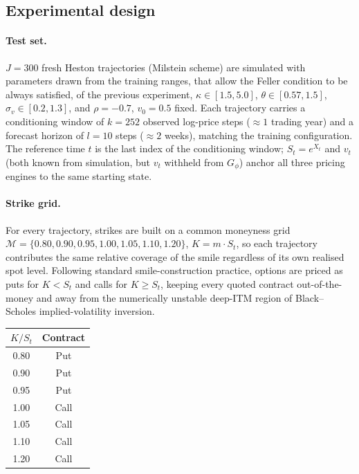 \subsection{Experimental design}

\paragraph{Test set.} $J=300$ fresh Heston trajectories (Milstein scheme)
are simulated with parameters drawn from the training ranges, that allow the Feller condition to be always satisfied, of the previous experiment,
$\kappa\in[1.5,5.0]$, $\theta\in[0.57,1.5]$, $\sigma_v\in[0.2,1.3]$, and
$\rho=-0.7$, $v_0=0.5$ fixed. Each
trajectory carries a conditioning window of $k=252$ observed log-price
steps ($\approx1$ trading year) and a forecast horizon of $l=10$ steps
($\approx2$ weeks), matching the training configuration. The reference
time $t$ is the last index of the conditioning window; $S_t=e^{X_t}$ and
$v_t$ (both known from simulation, but $v_t$ withheld from $G_\phi$)
anchor all three pricing engines to the same starting state.

\paragraph{Strike grid.} For every trajectory, strikes are built on a
common moneyness grid $\mathcal M=\{0.80,0.90,0.95,1.00,1.05,1.10,1.20\}$,
$K=m\cdot S_t$, so each trajectory contributes the same relative coverage
of the smile regardless of its own realised spot level. Following
standard smile-construction practice, options are priced as puts for
$K<S_t$ and calls for $K\ge S_t$, keeping every quoted contract
out-of-the-money and away from the numerically unstable deep-ITM region
of Black--Scholes implied-volatility inversion.

\begin{table}[H]
\centering
\begin{tabular}{cc}
\hline
$K/S_t$ & \textbf{Contract} \\
\hline
0.80 & Put \\
0.90 & Put \\
0.95 & Put \\
1.00 & Call \\
1.05 & Call \\
1.10 & Call \\
1.20 & Call \\
\hline
\end{tabular}
\end{table}



